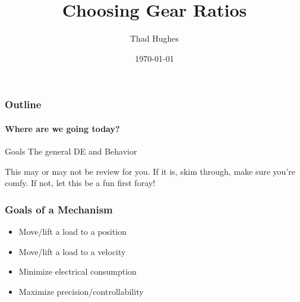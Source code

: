 \documentclass{beamer}%
\title{Choosing Gear Ratios}
\author{Thad Hughes}
\date{\today}
\begin{document}
\maketitle

\begin{frame}
\frametitle{Outline}
\framesubtitle{Where are we going today?}

\begin{outline}
	\1 Goals
	\1 The general DE and Behavior
\end{outline}

\begin{block}{}
	This may or may not be review for you. If it is, skim through, make sure you're comfy. If not, let this be a fun first foray!
\end{block}

\end{frame}

\begin{frame}
	\frametitle{Goals of a Mechanism}
	\begin{itemize}
		\item Move/lift a load to a position
		\item Move/lift a load to a velocity
		\item Minimize electrical consumption
		\item Maximize precision/controllability
	\end{itemize}
\end{frame}
\end{document}
